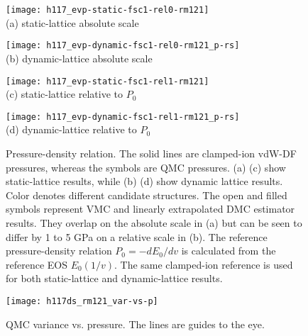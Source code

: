 \begin{figure}[h]
\centering
\begin{minipage}{0.49\textwidth}
\centering
\texttt{[image: h117\_evp-static-fsc1-rel0-rm121]}\\
(a) static-lattice absolute scale
\end{minipage}
\begin{minipage}{0.49\textwidth}
\centering
\texttt{[image: h117\_evp-dynamic-fsc1-rel0-rm121\_p-rs]}\\
(b) dynamic-lattice absolute scale
\end{minipage}
\begin{minipage}{0.49\textwidth}
\centering
\texttt{[image: h117\_evp-static-fsc1-rel1-rm121]}\\
(c) static-lattice relative to $P_0$
\end{minipage}
\begin{minipage}{0.49\textwidth}
\centering
\texttt{[image: h117\_evp-dynamic-fsc1-rel1-rm121\_p-rs]}\\
(d) dynamic-lattice relative to $P_0$
\end{minipage}
\caption{Pressure-density relation. The solid lines are clamped-ion vdW-DF pressures, whereas the symbols are QMC pressures. (a) (c) show static-lattice results, while (b) (d) show dynamic lattice results. Color denotes different candidate structures. The open and filled symbols represent VMC and linearly extrapolated DMC estimator results. They overlap on the absolute scale in (a) but can be seen to differ by 1 to 5 GPa on a relative scale in (b). The reference pressure-density relation $P_0=-dE_0/dv$ is calculated from the reference EOS $E_0(1/v)$. The same clamped-ion reference is used for both static-lattice and dynamic-lattice results.}
\label{fig:hsolid-p-vs-n}
\end{figure}

\begin{figure}[h]
\centering
\begin{minipage}{0.49\linewidth}
\centering
\texttt{[image: h117ds\_rm121\_var-vs-p]}
\end{minipage}
\caption{QMC variance vs. pressure. The lines are guides to the eye.}
\label{fig:hsolid-v-vs-p}
\end{figure}

